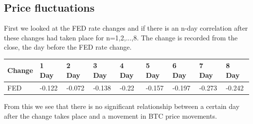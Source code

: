 \documentclass[12pt]{article}
\begin{document}
\subsection{Price fluctuations}
First we looked at the FED rate changes and if there is an n-day correlation after these changes had taken place for n=1,2,...,8. The change is recorded from the close, the day before the FED rate change.
\begin{center}
\begin{tabular}{|l|l|l|l|l|l|l|l|l|}
\hline
Change & 1 Day  & 2 Day  & 3 Day  & 4 Day & 5 Day  & 6 Day  & 7 Day  & 8 Day  \\ \hline
FED    & -0.122 & -0.072 & -0.138 & -0.22 & -0.157 & -0.197 & -0.273 & -0.242 \\ \hline
\end{tabular}
\end{center}
From this we see that there is no significant relationship between a certain day after the change takes place and a movement in BTC price movements.\\
\newline
\end{document}
